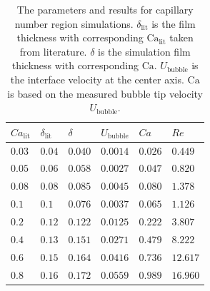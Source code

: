 \documentclass[preprint,12pt]{elsarticle}
\newcommand{\Ca}{\mathrm{Ca}}
\begin{document}
\begin{table}
\begin{tabularx}{\textwidth}{|X|X|X|X|X|X|}
\hline
$Ca_{\mathrm{lit}}$&$\delta_{\mathrm{lit}}$&$\delta$&$U_{\mathrm{bubble}}$&$Ca$&{\color{red}$Re$}\\
\hline
$0.03$&$0.04$&$0.040$&$0.0014$&$0.026$&$0.449$\\
\hline
$0.05$&$0.06$&$0.058$&$0.0027$&$0.047$&$0.820$\\
\hline
$0.08$&$0.08$&$0.085$&$0.0045$&$0.080$&$1.378$\\
\hline
$0.1$&$0.1$&$0.076$&$0.0037$&$0.065$&$1.126$\\
\hline
$0.2$&$0.12$&$0.122$&$0.0125$&$0.222$&$3.807$\\
\hline
$0.4$&$0.13$&$0.151$&$0.0271$&$0.479$&$8.222$\\
\hline
$0.6$&$0.15$&$0.164$&$0.0416$&$0.736$&$12.617$\\
\hline
$0.8$&$0.16$&$0.172$&$0.0559$&$0.989$&$16.960$\\
\hline
\end{tabularx}
\caption{The parameters and results for capillary number region simulations.
$\delta_{\mathrm{lit}}$ is the film thickness with corresponding $\Ca_{\mathrm{lit}}$ taken from
literature. $\delta$ is the simulation film thickness with corresponding $\Ca$.
{\color{red}$U_{\mathrm{bubble}}$ is the interface velocity at the center axis.} $\Ca$ is based on
the measured bubble tip velocity
$U_{\mathrm{bubble}}$.
\label{table:parameters:capillary:number}}
\end{table}
\end{document}

